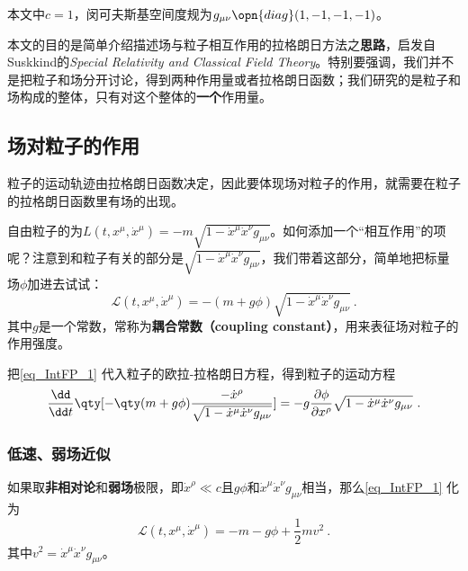 

本文中$c=1$，闵可夫斯基空间度规为$g_{\mu\nu}\opn{diag}(1, -1, -1, -1)$。

本文的目的是简单介绍描述场与粒子相互作用的拉格朗日方法之\textbf{思路}，启发自Suskkind的\textsl{Special Relativity and Classical Field Theory}\cite{SusskindClassicalFields}。特别要强调，我们并不是把粒子和场分开讨论，得到两种作用量或者拉格朗日函数；我们研究的是粒子和场构成的整体，只有对这个整体的\textbf{一个}作用量。

\subsection{场对粒子的作用}

粒子的运动轨迹由拉格朗日函数决定，因此要体现场对粒子的作用，就需要在粒子的拉格朗日函数里有场的出现。

自由粒子的为$L(t, x^\mu, \dot{x}^\mu ) = -m\sqrt{1-\dot{x}^\mu \dot{x}^\nu g_{\mu\nu}}$。如何添加一个“相互作用”的项呢？注意到和粒子有关的部分是$\sqrt{1-\dot{x}^\mu \dot{x}^\nu g_{\mu\nu}}$，我们带着这部分，简单地把标量场$\phi$加进去试试：
\begin{equation}\label{eq_IntFP_1}
\mathcal{L}(t, x^\mu, \dot{x}^\mu ) = -(m+g\phi)\sqrt{1-\dot{x}^\mu \dot{x}^\nu g_{\mu\nu}}~.
\end{equation}
其中$g$是一个常数，常称为\textbf{耦合常数（coupling constant）}，用来表征场对粒子的作用强度。

把\autoref{eq_IntFP_1} 代入粒子的欧拉-拉格朗日方程，得到粒子的运动方程
\begin{equation}\label{eq_IntFP_2}
\frac{\dd }{\dd t} \qty[-\qty(m+g\phi)\frac{-\dot{x}^\rho}{\sqrt{1-\dot{x}^\mu \dot{x}^\nu g_{\mu\nu}}}] = -g\frac{\partial \phi}{\partial x^\rho}\sqrt{1-\dot{x}^\mu \dot{x}^\nu g_{\mu\nu}}~.
\end{equation}


\subsubsection{低速、弱场近似}

如果取\textbf{非相对论}和\textbf{弱场}极限，即$\dot{x}^\rho\ll c$且$g\phi$和$\dot{x}^\mu \dot{x}^\nu g_{\mu\nu}$相当，那么\autoref{eq_IntFP_1} 化为
\begin{equation}\label{eq_IntFP_3}
\mathcal{L}(t, x^\mu, \dot{x}^\mu ) = -m-g\phi+\frac{1}{2}mv^2~.
\end{equation}
其中$v^2=\dot{x}^\mu \dot{x}^\nu g_{\mu\nu}$。

